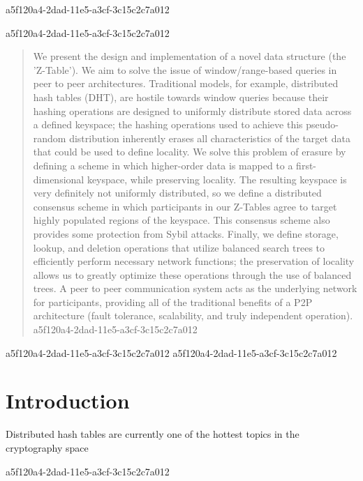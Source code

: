 \documentclass[12pt]{article}
\begin{document}
a5f120a4-2dad-11e5-a3cf-3c15c2c7a012\maketitle
a5f120a4-2dad-11e5-a3cf-3c15c2c7a012
\begin{abstract}
We present the design and implementation of a novel data structure (the 'Z-Table'). We aim to solve the issue of window/range-based queries in peer to peer architectures. Traditional models, for example,  distributed hash tables (DHT), are hostile towards window queries because their hashing operations are designed to uniformly distribute stored data across a defined keyspace; the hashing operations used to achieve this pseudo-random distribution inherently erases all characteristics of the target data that could be used to define locality. We solve this problem of erasure by defining a scheme in which higher-order data is mapped to a first-dimensional keyspace, while preserving locality. The resulting keyspace is very definitely not uniformly distributed, so we define a distributed consensus scheme in which participants in our Z-Tables agree to target highly populated regions of the keyspace. This consensus scheme also provides some protection from Sybil attacks. Finally, we define storage, lookup, and deletion operations that utilize balanced search trees to efficiently perform necessary network functions; the preservation of locality allows us to greatly optimize these operations through the use of balanced trees. A peer to peer communication system acts as the underlying network for participants, providing all of the traditional benefits of a P2P architecture (fault tolerance, scalability, and truly independent operation).
a5f120a4-2dad-11e5-a3cf-3c15c2c7a012\end{abstract}


a5f120a4-2dad-11e5-a3cf-3c15c2c7a012\newpage
a5f120a4-2dad-11e5-a3cf-3c15c2c7a012\section{Introduction}
Distributed hash tables are currently one of the hottest topics in the cryptography space~\cite{Stoica:2001dj,Rowstron:2001ea,Ratnasamy:2001wn}

\printbibliography
a5f120a4-2dad-11e5-a3cf-3c15c2c7a012
\end{document}
